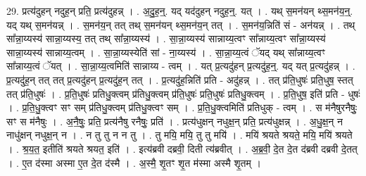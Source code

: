 \documentclass[17pt]{extarticle}
\begin{document}
29. प्रत्य॑दुहन् नदुह॒न् प्रति॒ प्रत्य॑दुहन्न् । . अ॒दु॒ह॒न्॒. यद् यद॑दुहन् नदुह॒न्॒. यत् । . यथ् स॒मन॑यन् थ्स॒मन॑य॒न्॒. यद् यथ् स॒मन॑यन्न् । . स॒मन॑य॒न् तत् तथ् स॒मन॑यन् थ्स॒मन॑य॒न् तत् । . स॒मन॑य॒न्निति॑ सं - अन॑यन्न् । . तथ् सा᳚न्ना॒य्यस्य॑ सान्ना॒य्यस्य॒ तत् तथ् सा᳚न्ना॒य्यस्य॑ । . सा॒न्ना॒य्यस्य॑ सान्नाय्य॒त्वꣳ सा᳚न्नाय्य॒त्वꣳ सा᳚न्ना॒य्यस्य॑ सान्ना॒य्यस्य॑ सान्नाय्य॒त्वम् । . सा॒न्ना॒य्यस्येति॑ सां - ना॒य्यस्य॑ । . सा॒न्ना॒य्य॒त्वं ॅयद् यथ् सा᳚न्नाय्य॒त्वꣳ सा᳚न्नाय्य॒त्वं ॅयत् । . सा॒न्ना॒य्य॒त्वमिति॑ सान्नाय्य - त्वम् । . यत् प्र॒त्यदु॑हन् प्र॒त्यदु॑ह॒न्॒. यद् यत् प्र॒त्यदु॑हन्न् । . प्र॒त्यदु॑ह॒न् तत् तत् प्र॒त्यदु॑हन् प्र॒त्यदु॑ह॒न् तत् । . प्र॒त्यदु॑ह॒न्निति॑ प्रति - अदु॑हन्न् । . तत् प्र॑ति॒धुषः॑ प्रति॒धुष॒ स्तत् तत् प्र॑ति॒धुषः॑ । . प्र॒ति॒धुषः॑ प्रतिधु॒क्त्वम् प्र॑तिधु॒क्त्वम् प्र॑ति॒धुषः॑ प्रति॒धुषः॑ प्रतिधु॒क्त्वम् । . प्र॒ति॒धुष॒ इति॑ प्रति - धुषः॑ । . प्र॒ति॒धु॒क्त्वꣳ सꣳ सम् प्र॑तिधु॒क्त्वम् प्र॑तिधु॒क्त्वꣳ सम् । . प्र॒ति॒धु॒क्त्वमिति॑ प्रतिधुक् - त्वम् । . स म॑नैषुरनैषुः॒ सꣳ स म॑नैषुः । . अ॒नै॒षुः॒ प्रति॒ प्रत्य॑नैषु रनैषुः॒ प्रति॑ । . प्रत्य॑धुक्षन् नधुक्ष॒न् प्रति॒ प्रत्य॑धुक्षन्न् । . अ॒धु॒क्ष॒न् न नाधु॑क्षन् नधुक्ष॒न् न । . न तु तु न न तु । . तु मयि॒ मयि॒ तु तु मयि॑ । . मयि॑ श्रयते श्रयते॒ मयि॒ मयि॑ श्रयते । . श्र॒य॒त॒ इतीति॑ श्रयते श्रयत॒ इति॑ । . इत्य॑ब्रवी दब्रवी॒ दिती त्य॑ब्रवीत् । . अ॒ब्र॒वी॒ दे॒त दे॒त द॑ब्रवी दब्रवी दे॒तत् । . ए॒त द॑स्मा अस्मा ए॒त दे॒त द॑स्मै । . अ॒स्मै॒ शृ॒तꣳ शृ॒त म॑स्मा अस्मै शृ॒तम् । \newline
\end{document}
